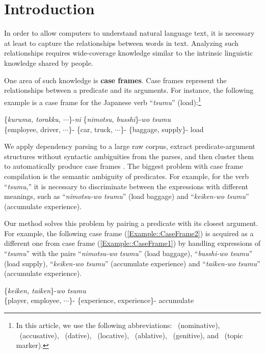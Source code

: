 \documentclass[english]{jnlp_1.4_rep}
\newcommand{\nom}{}
\newcommand{\acc}{}
\newcommand{\dat}{}
\newcommand{\abl}{}
\newcommand{\gen}{}
\newcommand{\loc}{}
\newcommand{\TOP}{}
\begin{document}
\maketitle

\section{Introduction}

In order to allow computers to understand natural language text, it is
necessary at least to capture the relationships between words in
text. Analyzing such relationships requires wide-coverage knowledge
similar to the intrinsic linguistic knowledge shared by people.

One area of such knowledge is \textbf{case frames}. Case frames represent the
relationships between a predicate and its arguments. For instance, the
following example is a case frame for the Japanese verb
``\textit{tsumu}'' (load):\footnote{In this article, we use the
following abbreviations: \nom~(nominative), \acc~(accusative),
\dat~(dative), \loc~(locative), \abl~(ablative), \gen~(genitive), and \TOP~(topic marker).}
\begin{exe}
\ex \label{Example::CaseFrame1}
  {\{\textit{kuruma, torakku, $\cdots$}\}-\textit{ni}} {\{\textit{nimotsu, busshi}\}-\textit{wo}} {\textit{tsumu}} \\
      {\{employee, driver, $\cdots$\}-\nom} {\{car, truck, $\cdots$\}-\dat} {\{baggage, supply\}-\acc} {load} \\
\end{exe}

We apply dependency parsing to a large raw corpus, extract
predicate-argument structures without syntactic ambiguities from the
parses, and then cluster them to automatically produce case frames \cite{Kawahara2001}.
The biggest problem with case frame compilation is the semantic ambiguity of predicates. For example, for
the verb ``\textit{tsumu},'' it is necessary to discriminate between the
expressions with different meanings, such as ``\textit{nimotsu-wo tsumu}'' (load
baggage) and ``\textit{keiken-wo tsumu}'' (accumulate experience).

Our method solves this problem by pairing a predicate with its
closest argument. For example, the following case frame (\ref{Example::CaseFrame2}) is acquired as a different one from case frame
(\ref{Example::CaseFrame1}) by handling expressions of
``\textit{tsumu}'' with the pairs ``\textit{nimotsu-wo tsumu}'' (load
baggage), ``\textit{busshi-wo tsumu}'' (load supply),
``\textit{keiken-wo tsumu}'' (accumulate experience) and
``\textit{taiken-wo tsumu}'' (accumulate experience).
\begin{exe}
\ex \label{Example::CaseFrame2}
  {\{\textit{keiken, taiken}\}-\textit{wo}} {\textit{tsumu}} \\
      {\{player, employee, $\cdots$\}-\nom} {\{experience, experience\}-\acc} {accumulate} \\
\end{exe}
\end{document}
